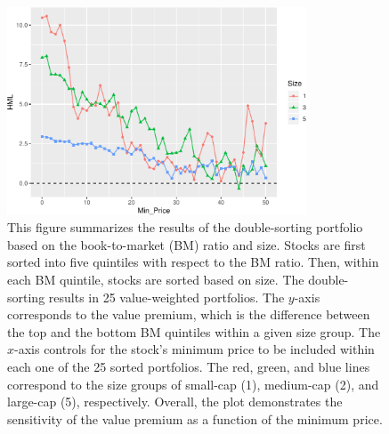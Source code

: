 \begin{Schunk}

\begin{figure}
\caption{This figure summarizes the results of the double-sorting portfolio based on the book-to-market (BM) ratio and size. Stocks are first sorted into five quintiles with respect to the BM ratio. Then, within each BM quintile, stocks are sorted based on size. The double-sorting results in 25 value-weighted portfolios. The $y$-axis corresponds to the value premium, which is the difference between the top and the bottom BM quintiles within a given size group. The $x$-axis controls for the stock's minimum price to be included within each one of the 25 sorted portfolios. The red, green, and blue lines correspond to the size groups of small-cap (1), medium-cap (2), and large-cap (5), respectively. Overall, the plot demonstrates the sensitivity of the value premium as a function of the minimum price. 
}
\label{fig:value_effect}
    \begin{center}
\includegraphics[width = 3.5in]{CRSP_COMP_files/figure-latex/unnamed-chunk-40-1}
 \end{center}
\end{figure}
\end{Schunk}



